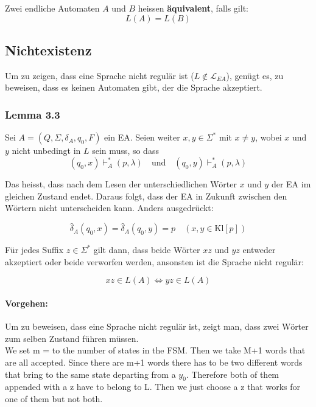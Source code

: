 \documentclass[11pt]{article}
\begin{document}
Zwei endliche Automaten $A$ und $B$ heissen \textbf{{\"a}quivalent}, falls gilt:
\begin{equation*}
	L(A) = L(B)
\end{equation*}

\subsection{Nichtexistenz}

Um zu zeigen, dass eine Sprache nicht regul{\"a}r ist ($L \notin \mathcal{L}_{EA}$), gen{\"u}gt es, zu beweisen, dass es keinen Automaten gibt, der die Sprache akzeptiert.

\subsubsection{Lemma 3.3}

Sei $A = (Q, \Sigma, \delta_A, q_0, F)$ ein EA. Seien weiter $x,y \in \Sigma^*$ mit $x \neq y$, wobei $x$ und $y$ nicht unbedingt in $L$ sein muss, so dass
\begin{equation*}
	(q_0, x) \vdash_A^* (p, \lambda)\quad\text{und}\quad (q_0, y) \vdash_A^* (p, \lambda)
\end{equation*}

Das heisst, dass nach dem Lesen der unterschiedlichen W{\"o}rter $x$ und $y$ der EA im gleichen Zustand endet. Daraus folgt, dass der EA in Zukunft zwischen den W{\"o}rtern nicht unterscheiden kann. Anders ausgedr{\"u}ckt:

\begin{equation*}
	\hat\delta_A(q_0, x) = \hat\delta_A(q_0, y) = p \quad (x, y \in \text{Kl}[p])
\end{equation*}

F{\"u}r jedes Suffix $z \in \Sigma^*$ gilt dann, dass beide W{\"o}rter $xz$ und $yz$ entweder akzeptiert oder beide verworfen werden, ansonsten ist die Sprache nicht regul{\"a}r:

\begin{equation*}
	xz \in L(A) \Leftrightarrow yz \in L(A)
\end{equation*}

\paragraph{Vorgehen:} Um zu beweisen, dass eine Sprache nicht regul{\"a}r ist, zeigt man, dass zwei W{\"o}rter zum selben Zustand f{\"u}hren m{\"u}ssen.\\
	We set m = to the number of states in the FSM. Then we take M+1 words that are all accepted. Since there are m+1 words there has to be two different words that bring to the same state departing from a $y_0$. Therefore both of them appended with a z have to belong to L. Then we just choose a z that works for one of them but not both.
\end{document}
